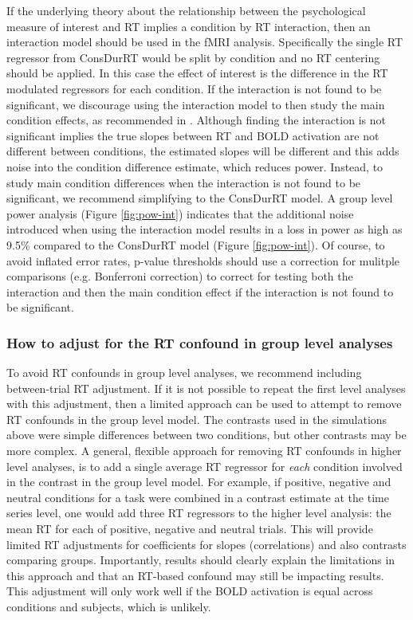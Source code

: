 \documentclass[titlepage,12pt] {article}
\begin{document}
If the underlying theory about the relationship between the psychological measure of interest and RT implies a condition by RT interaction, then an interaction model should be used in the fMRI analysis.  Specifically the single RT regressor from ConsDurRT would be split by condition and no RT centering should be applied.  In this case the effect of interest is the difference in the RT modulated regressors for each condition.  If the interaction is not found to be significant, we discourage using the interaction model to then study the main condition effects, as recommended in \citet{carp_conditional_2010}.  Although finding the interaction is not significant implies the true slopes between RT and BOLD activation are not different between conditions, the estimated slopes will be different and this adds noise into the condition difference estimate, which reduces power.  Instead, to study main condition differences when the interaction is not found to be significant, we recommend simplifying to the ConsDurRT model.  A group level power analysis (Figure \ref{fig:pow-int}) indicates that the additional noise introduced when using the interaction model results in a loss in power as high as 9.5\% compared to the ConsDurRT model (Figure \ref{fig:pow-int}).  Of course, to avoid inflated error rates, p-value thresholds should use a correction for mulitple comparisons (e.g. Bonferroni correction) to correct for testing both the interaction and then the main condition effect if the interaction is not found to be significant.

\subsubsection*{How to adjust for the RT confound in group level analyses}

To avoid RT confounds in group level analyses, we recommend including between-trial RT adjustment.  If it is not possible to repeat the first level analyses with this adjustment, then a limited approach can be used to attempt to remove RT confounds in the group level model.  The contrasts used in the simulations above were simple differences between two conditions, but other contrasts may be more complex.  A general, flexible approach for removing RT confounds in higher level analyses, is to  add a single average RT regressor for \emph{each} condition involved in the contrast in the group level model.  For example, if positive, negative and neutral conditions for a task were combined in a contrast estimate at the time series level, one would add three RT regressors to the higher level analysis: the mean RT for each of positive, negative and neutral trials.  This will provide limited RT adjustments for coefficients for slopes (correlations) and also contrasts comparing groups.  Importantly, results should clearly explain the limitations in this approach and that an RT-based confound may still be impacting results. This adjustment will only work well if the BOLD activation is equal across conditions and subjects, which is unlikely.
\end{document}

